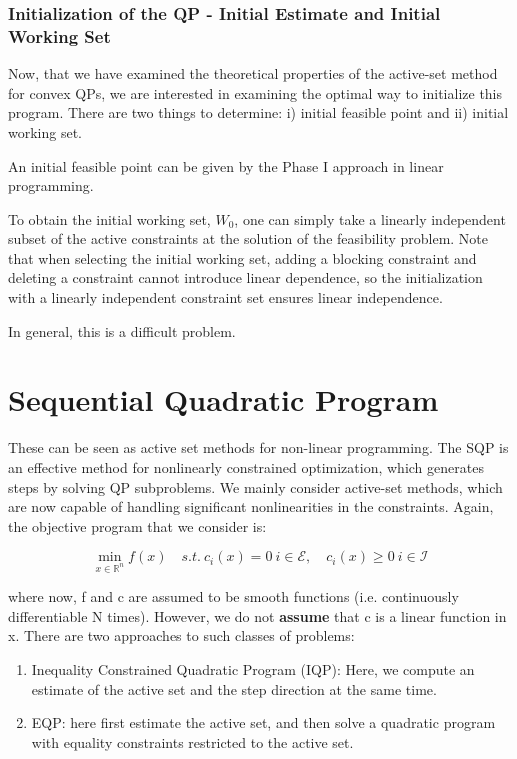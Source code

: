 \documentclass[class=article, crop=false]{standalone}
\begin{document}
		\subsubsection{Initialization of the QP - Initial Estimate and Initial Working Set}
			Now, that we have examined the theoretical properties of the active-set method for convex QPs, we are interested in examining the optimal way to initialize this program. There are two things to determine: i) initial feasible point and ii) initial working set.

			An initial feasible point can be given by the Phase I approach in linear programming.

			To obtain the initial working set, $W_0$, one can simply take a linearly independent subset of the active constraints at the solution of the feasibility problem. Note that when selecting the initial working set, adding a blocking constraint and deleting a constraint cannot introduce linear dependence, so the initialization with a linearly independent constraint set ensures linear independence.

			In general, this is a difficult problem.

\section{Sequential Quadratic Program}
	These can be seen as active set methods for non-linear programming. The SQP is an effective method for nonlinearly constrained optimization, which generates steps by solving QP subproblems. We mainly consider active-set methods, which are now capable of handling significant nonlinearities in the constraints. Again, the objective program that we consider is:

		$$\min_{x \in \mathbb{R}^n} f(x) \quad s.t.\ c_i(x) = 0 \ i \in \mathcal{E}, \quad c_i(x) \ge 0 \ i \in \mathcal{I}$$

	where now, f and c are assumed to be smooth functions (i.e. continuously differentiable N times). However, we do not \textbf{assume} that c is a linear function in x. There are two approaches to such classes of problems:

	\begin{enumerate}
		\item Inequality Constrained Quadratic Program (IQP): Here, we compute an estimate of the active set and the step direction at the same time.
		\item EQP: here first estimate the active set, and then solve a quadratic program with equality constraints restricted to the active set.
	\end{enumerate}
\end{document}
